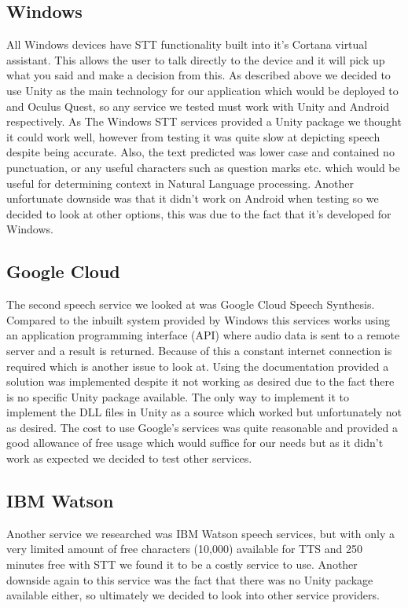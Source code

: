 \subsection{Windows}
All Windows devices have STT functionality built into it's Cortana virtual assistant. This allows the user to talk directly to the device and it will pick up what you said and make a decision from this. As described above we decided to use Unity as the main technology for our application which would be deployed to and Oculus Quest, so any service we tested must work with Unity and Android respectively. As The Windows STT services provided a Unity package we thought it could work well, however from testing it was quite slow at depicting speech despite being accurate. Also, the text predicted was lower case and contained no punctuation, or any useful characters such as question marks etc. which would be useful for determining context in Natural Language processing. Another unfortunate downside was that it didn't work on Android when testing so we decided to look at other options, this was due to the fact that it's developed for Windows. 

\subsection{Google Cloud}
The second speech service we looked at was Google Cloud Speech Synthesis. Compared to the inbuilt system provided by Windows this services works using an application programming interface (API) where audio data is sent to a remote server and a result is returned. Because of this a constant internet connection is required which is another issue to look at. Using the documentation provided a solution was implemented despite it not working as desired due to the fact there is no specific Unity package available. The only way to implement it to implement the DLL files in Unity as a source which worked but unfortunately not as desired. The cost to use Google's services was quite reasonable and provided a good allowance of free usage which would suffice for our needs but as it didn't work as expected we decided to test other services.

\subsection{IBM Watson}
Another service we researched was IBM Watson speech services, but with only a very limited amount of free characters (10,000) available for TTS and 250 minutes free with STT we found it to be a costly service to use. Another downside again to this service was the fact that there was no Unity package available either, so ultimately we decided to look into other service providers.

